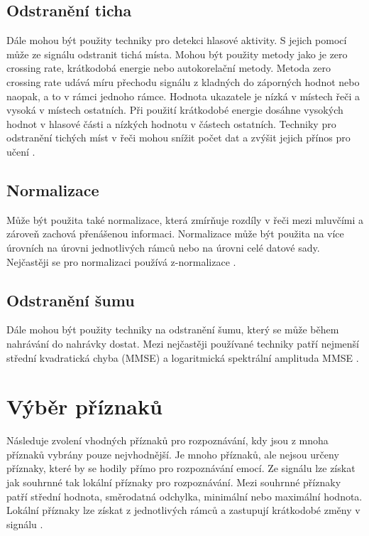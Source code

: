 \documentclass[FM,BP]{tulthesis}
\begin{document}
\subsection{Odstranění ticha} %
Dále mohou být použity techniky pro detekci hlasové aktivity. S jejich pomocí může ze signálu odstranit tichá místa. Mohou být použity metody jako je zero crossing rate, krátkodobá energie nebo autokorelační metody. Metoda zero crossing rate udává míru přechodu signálu z kladných do záporných hodnot nebo naopak, a to v rámci jednoho rámce. Hodnota ukazatele je nízká v místech řeči a vysoká v místech ostatních. Při použití krátkodobé energie dosáhne vysokých hodnot v hlasové části a nízkých hodnotu v částech ostatních. Techniky pro odstranění tichých míst v řeči mohou snížit počet dat a zvýšit jejich přínos pro učení \cite{DBLP:journals/speech/AkcayO20}.

\subsection{Normalizace} %
Může být použita také normalizace, která zmírňuje rozdíly v řeči mezi mluvčími a zároveň zachová přenášenou informaci. Normalizace může být použita na více úrovních na úrovni jednotlivých rámců nebo na úrovni celé datové sady. Nejčastěji se pro normalizaci používá z-normalizace \cite{DBLP:journals/speech/AkcayO20}.

\subsection{Odstranění šumu} %
Dále mohou být použity techniky na odstranění šumu, který se může během nahrávání do nahrávky dostat. Mezi nejčastěji používané techniky patří nejmenší střední kvadratická chyba (MMSE) a logaritmická spektrální amplituda MMSE \cite{DBLP:journals/speech/AkcayO20}.

\section{Výběr příznaků} %
Následuje zvolení vhodných příznaků pro rozpoznávání, kdy jsou z mnoha příznaků vybrány pouze nejvhodnější. Je mnoho příznaků, ale nejsou určeny příznaky, které by se hodily přímo pro rozpoznávání emocí. Ze signálu lze získat jak souhrnné tak lokální příznaky pro rozpoznávání. Mezi souhrnné  příznaky patří střední hodnota, směrodatná odchylka, minimální nebo maximální hodnota. Lokální příznaky lze získat z jednotlivých rámců a zastupují krátkodobé změny v signálu \cite{DBLP:journals/speech/AkcayO20}.
\end{document}
